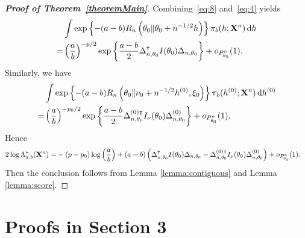 \documentclass[11pt]{article}
\newcommand{\myT}{\intercal}
\theoremstyle{plain}
\theoremstyle{definition}
\theoremstyle{remark}
\begin{document}
\begin{appendices}
\begin{proof}[\textbf{Proof of Theorem~\ref{theoremMain}}]
Combining~\eqref{eq:8} and~\eqref{eq:4} yields
\begin{equation*}
    \begin{split}
    &\int 
\exp\left\{ - (a-b) R_n \left( \theta_0 \| \theta_0 + n^{-1/2} h \right) \right\}
    \pi_b (h;\BX^{n})  \, \mathrm dh
    \\
    =&\left(\frac{a}{b}\right)^{-p/2} \exp\left\{\frac{a-b}{2}\Delta_{n,\theta_0}^\myT  I(\theta_0)\Delta_{n,\theta_0}\right\}+o_{P_{\theta_0}^n}(1).
    \end{split}
\end{equation*}
Similarly, we have
\begin{equation*}
    \begin{split}
    &\int 
\exp\left\{ - (a-b) R_n \left( \theta_0 \| \nu_0 + n^{-1/2} h^{(0)}, \xi_0 \right) \right\}
    \pi_b (h^{(0)};\BX^{n})  \, \mathrm dh^{(0)}
    \\
    =&\left(\frac{a}{b}\right)^{-p_0/2} \exp\left\{\frac{a-b}{2}\Delta_{n,\theta_0}^{(0)\myT} I_\nu(\theta_0)\Delta^{(0)}_{n,\theta_0}\right\}+o_{P_{\theta_0}^n}(1).
    \end{split}
\end{equation*}
Hence
\begin{equation*}
    \begin{aligned} 
        2\log \Lambda_{a,b}^* (\BX^n)
        =&
        -{(p-p_0)}\log \left(\frac{a}{b}\right)+{(a-b)}\left(
            \Delta_{n,\theta_0}^\myT  I(\theta_0) \Delta_{n,\theta_0}
        -\Delta_{n,\theta_0}^{(0)\myT} I_\nu(\theta_0)\Delta^{(0)}_{n,\theta_0}\right)
        +o_{P^n_{\theta_0}}(1).
    \end{aligned}
\end{equation*}
Then the conclusion follows from Lemma \ref{lemma:contiguous} and Lemma \ref{lemma:score}.
\end{proof}

\section{Proofs in Section 3}


\end{appendices}
\end{document}
